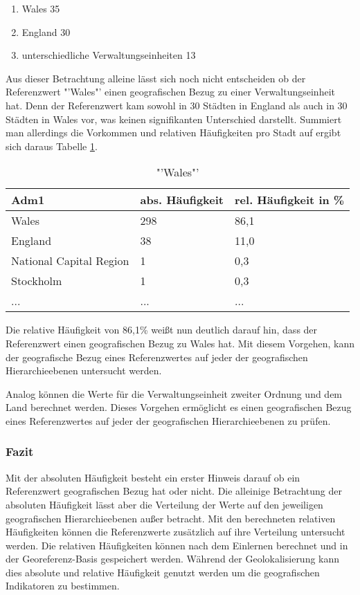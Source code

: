 			\begin{enumerate}
				\item Wales 35
				\item England 30
				\item unterschiedliche Verwaltungseinheiten 13
			\end{enumerate}

			Aus dieser Betrachtung alleine lässt sich noch nicht entscheiden ob der Referenzwert "'Wales"' einen geografischen Bezug zu einer Verwaltungseinheit hat.
			Denn der Referenzwert kam sowohl in 30 Städten in England als auch in 30 Städten in Wales vor, was keinen signifikanten Unterschied darstellt. 
			Summiert man allerdings die Vorkommen und relativen Häufigkeiten pro Stadt auf ergibt sich daraus Tabelle \ref{tab:WalesVerw1}.

			\begin{table}[h]
			\centering
			\caption{"'Wales"'}
			\label{tab:WalesVerw1}
			\begin{tabular}{|l|l|l|}
			\hline
			Adm1 & abs. Häufigkeit & rel. Häufigkeit in \% \\ \hline \hline
			Wales                   & 298 & 86,1 \\ \hline
			England                 & 38  & 11,0 \\ \hline
			National Capital Region & 1   & 0,3  \\ \hline
			Stockholm               & 1   & 0,3  \\ \hline
			... & ... & ... \\ \hline
			\end{tabular}
			\end{table}  

			Die relative Häufigkeit von 86,1\% weißt nun deutlich darauf hin, dass der Referenzwert einen geografischen Bezug zu Wales hat.
			Mit diesem Vorgehen, kann der geografische Bezug eines Referenzwertes auf jeder der geografischen Hierarchieebenen untersucht werden.

			Analog können die Werte für die Verwaltungseinheit zweiter Ordnung und dem Land berechnet werden.
			Dieses Vorgehen ermöglicht es einen geografischen Bezug eines Referenzwertes auf jeder der geografischen Hierarchieebenen zu prüfen.

		\subsubsection{Fazit}

			Mit der absoluten Häufigkeit besteht ein erster Hinweis darauf ob ein Referenzwert geografischen Bezug hat oder nicht.
			Die alleinige Betrachtung der absoluten Häufigkeit lässt aber die Verteilung der Werte auf den jeweiligen geografischen Hierarchieebenen außer betracht.
			Mit den berechneten relativen Häufigkeiten können die Referenzwerte zusätzlich auf ihre Verteilung untersucht werden.
			Die relativen Häufigkeiten können nach dem Einlernen berechnet und in der Georeferenz-Basis gespeichert werden. 
			Während der Geolokalisierung kann dies absolute und relative Häufigkeit genutzt werden um die geografischen Indikatoren zu bestimmen. 

